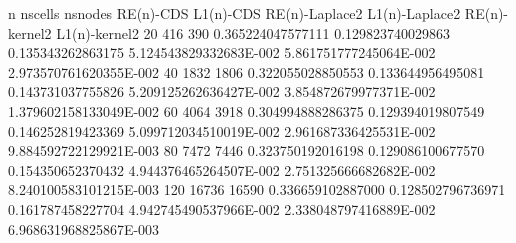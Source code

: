           n      nscells     nsnodes             RE(n)-CDS          L1(n)-CDS          RE(n)-Laplace2             L1(n)-Laplace2           RE(n)-kernel2          L1(n)-kernel2  
          20         416         390     0.365224047577111       0.129823740029863   0.135343262863175       5.124543829332683E-002  5.861751777245064E-002  2.973570761620355E-002
          40        1832        1806     0.322055028850553       0.133644956495081   0.143731037755826       5.209125262636427E-002  3.854872679977371E-002  1.379602158133049E-002
          60        4064        3918     0.304994888286375       0.129394019807549   0.146252819423369       5.099712034510019E-002  2.961687336425531E-002  9.884592722129921E-003
          80        7472        7446     0.323750192016198       0.129086100677570   0.154350652370432       4.944376465264507E-002  2.751325666682682E-002  8.240100583101215E-003
         120       16736       16590     0.336659102887000       0.128502796736971   0.161787458227704       4.942745490537966E-002  2.338048797416889E-002  6.968631968825867E-003